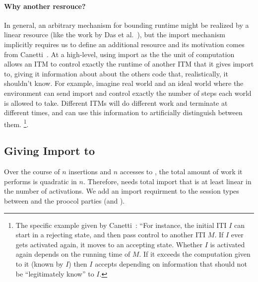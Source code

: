 \paragraph{Why another resrouce?} 
In general, an arbitrary mechanism for bounding runtime might be realized by a linear resource (like the work by Das et al.~\cite{rast}), but the import mechanism implicitly requires us to define an additional resource and its motivation comes from Canetti~\cite{UC}.
At a high-level, using import as the the unit of computation allows an ITM to control exactly the runtime of another ITM that it gives import to, giving it information about about the others code that, realistically, it shouldn't know.
For example, imagine real world and an ideal world where the environment can send import and control exactly the number of steps each world is allowed to take.
Different ITMs will do different work and terminate at different times, and \Z can use this information to artificially distinguish between them.
\footnote{The specific example given by Canetti~\cite{UC}: ``For instance, the initial ITI $I$ can start in a rejecting state, and then pass control to another ITI $M$. If $I$ ever gets activated again, it moves to an accepting state. Whether $I$ is activated again depends on the running time of $M$. If it exceeds the computation given to it (known by $I$) then $I$ accepts depending on information that should not be ``legitimately know'' to $I$.}.

\subsection{Giving Import to \Fdb}
Over the course of $n$ insertions and $n$ accesses to \Fdb, the total amount of work it performs is quadratic in $n$.
Therefore, \Fdb needs total import that is at least linear in the number of activations.
We add an import requirment to the session types between \Fdb and the proocol parties (and \A).

